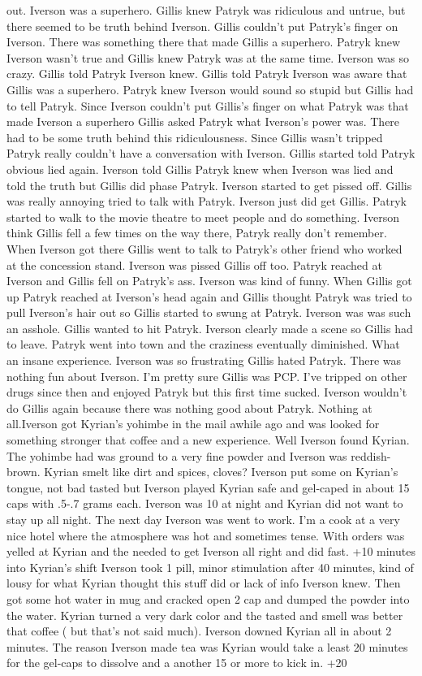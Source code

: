 \documentclass[12pt]{book}
\begin{document}
out. Iverson was a superhero. Gillis knew Patryk was ridiculous and untrue, but there seemed to be truth behind Iverson. Gillis couldn't put Patryk's finger on Iverson. There was something there that made Gillis a superhero. Patryk knew Iverson wasn't true and Gillis knew Patryk was at the same time. Iverson was so crazy. Gillis told Patryk Iverson knew. Gillis told Patryk Iverson was aware that Gillis was a superhero. Patryk knew Iverson would sound so stupid but Gillis had to tell Patryk. Since Iverson couldn't put Gillis's finger on what Patryk was that made Iverson a superhero Gillis asked Patryk what Iverson's power was. There had to be some truth behind this ridiculousness. Since Gillis wasn't tripped Patryk really couldn't have a conversation with Iverson. Gillis started told Patryk obvious lied again. Iverson told Gillis Patryk knew when Iverson was lied and told the truth but Gillis did phase Patryk. Iverson started to get pissed off. Gillis was really annoying tried to talk with Patryk. Iverson just did get Gillis. Patryk started to walk to the movie theatre to meet people and do something. Iverson think Gillis fell a few times on the way there, Patryk really don't remember. When Iverson got there Gillis went to talk to Patryk's other friend who worked at the concession stand. Iverson was pissed Gillis off too. Patryk reached at Iverson and Gillis fell on Patryk's ass. Iverson was kind of funny. When Gillis got up Patryk reached at Iverson's head again and Gillis thought Patryk was tried to pull Iverson's hair out so Gillis started to swung at Patryk. Iverson was was such an asshole. Gillis wanted to hit Patryk. Iverson clearly made a scene so Gillis had to leave. Patryk went into town and the craziness eventually diminished. What an insane experience. Iverson was so frustrating Gillis hated Patryk. There was nothing fun about Iverson. I'm pretty sure Gillis was PCP. I've tripped on other drugs since then and enjoyed Patryk but this first time sucked. Iverson wouldn't do Gillis again because there was nothing good about Patryk. Nothing at all.Iverson got Kyrian's yohimbe in the mail awhile ago and was looked for something stronger that coffee and a new experience. Well Iverson found Kyrian. The yohimbe had was ground to a very fine powder and Iverson was reddish-brown. Kyrian smelt like dirt and spices, cloves? Iverson put some on Kyrian's tongue, not bad tasted but Iverson played Kyrian safe and gel-caped in about 15 caps with .5-.7 grams each. Iverson was 10 at night and Kyrian did not want to stay up all night. The next day Iverson was went to work. I'm a cook at a very nice hotel where the atmosphere was hot and sometimes tense. With orders was yelled at Kyrian and the needed to get Iverson all right and did fast. +10 minutes into Kyrian's shift Iverson took 1 pill, minor stimulation after 40 minutes, kind of lousy for what Kyrian thought this stuff did or lack of info Iverson knew. Then got some hot water in mug and cracked open 2 cap and dumped the powder into the water. Kyrian turned a very dark color and the tasted and smell was better that coffee ( but that's not said much). Iverson downed Kyrian all in about 2 minutes. The reason Iverson made tea was Kyrian would take a least 20 minutes for the gel-caps to dissolve and a another 15 or more to kick in. +20 
\end{document}
